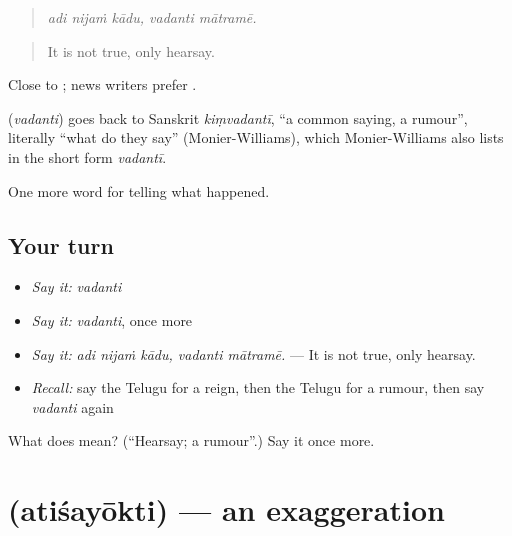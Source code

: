 \begin{quote}
\emph{adi nijaṁ kādu, vadanti mātramē.}
\end{quote}

\begin{quote}
It is not true, only hearsay.
\end{quote}

Close to ; news writers prefer .

\begin{cousinweb}
\textbf{} (\emph{vadanti}) goes back to Sanskrit \emph{kiṃvadantī}, \textquotedblleft{}a common saying, a rumour\textquotedblright{}, literally \textquotedblleft{}what do they say\textquotedblright{} (Monier-Williams), which Monier-Williams also lists in the short form \emph{vadantī}.
\end{cousinweb}

\begin{grammarlens}[title={What you've built}]
One more word for telling what happened.
\end{grammarlens}

\subsection*{Your turn}
\begin{itemize}
\raggedright
  \item \emph{Say it:} \emph{vadanti}
  \item \emph{Say it:} \emph{vadanti}, once more
  \item \emph{Say it:} \emph{adi nijaṁ kādu, vadanti mātramē.} — It is not true, only hearsay.
  \item \emph{Recall:} say the Telugu for a reign, then the Telugu for a rumour, then say \emph{vadanti} again
\end{itemize}

\begin{tcolorbox}[breakable,colback=teal!4,colframe=teal!35!black,title={Before you move on}]
What does  mean? (\textquotedblleft{}Hearsay; a rumour\textquotedblright{}.) Say it once more.
\end{tcolorbox}
\section[\texorpdfstring{\te{అతిశయోక్తి} (atiśayōkti)}{అతిశయోక్తి (atiśayōkti)}]{ (atiśayōkti) — an exaggeration}

\label{lesson:TE-C336-atisayokti}



